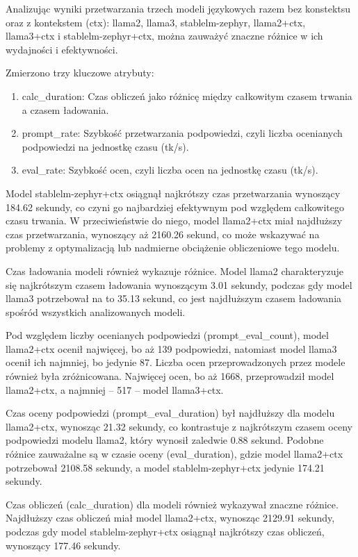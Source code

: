 Analizując wyniki przetwarzania trzech modeli językowych razem bez konstektsu oraz z kontekstem (ctx): llama2, llama3, stablelm-zephyr, llama2+ctx, llama3+ctx i stablelm-zephyr+ctx, można zauważyć znaczne różnice w ich wydajności i efektywności.


\noindent Zmierzono trzy kluczowe atrybuty:
\begin{enumerate}
    \item calc\_duration: Czas obliczeń jako różnicę między całkowitym czasem trwania a czasem ładowania.
    \item prompt\_rate: Szybkość przetwarzania podpowiedzi, czyli liczba ocenianych podpowiedzi na jednostkę czasu (tk/s).
    \item eval\_rate: Szybkość ocen, czyli liczba ocen na jednostkę czasu (tk/s).
\end{enumerate}

Model stablelm-zephyr+ctx osiągnął najkrótszy czas przetwarzania wynoszący 184.62 sekundy, co czyni go najbardziej efektywnym pod względem całkowitego czasu trwania. W przeciwieństwie do niego, model llama2+ctx miał najdłuższy czas przetwarzania, wynoszący aż 2160.26 sekund, co może wskazywać na problemy z optymalizacją lub nadmierne obciążenie obliczeniowe tego modelu.

Czas ładowania modeli również wykazuje różnice. Model llama2 charakteryzuje się najkrótszym czasem ładowania wynoszącym 3.01 sekundy, podczas gdy model llama3 potrzebował na to 35.13 sekund, co jest najdłuższym czasem ładowania spośród wszystkich analizowanych modeli.

Pod względem liczby ocenianych podpowiedzi (prompt\_eval\_count), model llama2+ctx ocenił najwięcej, bo aż 139 podpowiedzi, natomiast model llama3 ocenił ich najmniej, bo jedynie 87. Liczba ocen przeprowadzonych przez modele również była zróżnicowana. Najwięcej ocen, bo aż 1668, przeprowadził model llama2+ctx, a najmniej – 517 – model llama3+ctx.

Czas oceny podpowiedzi (prompt\_eval\_duration) był najdłuższy dla modelu llama2+ctx, wynosząc 21.32 sekundy, co kontrastuje z najkrótszym czasem oceny podpowiedzi modelu llama2, który wynosił zaledwie 0.88 sekund. Podobne różnice zauważalne są w czasie oceny (eval\_duration), gdzie model llama2+ctx potrzebował 2108.58 sekundy, a model stablelm-zephyr+ctx jedynie 174.21 sekundy.

Czas obliczeń (calc\_duration) dla modeli również wykazywał znaczne różnice. Najdłuższy czas obliczeń miał model llama2+ctx, wynosząc 2129.91 sekundy, podczas gdy model stablelm-zephyr+ctx osiągnął najkrótszy czas obliczeń, wynoszący 177.46 sekundy.

